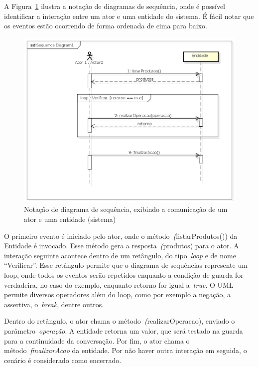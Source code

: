 A Figura~\ref{fig:exemplo-diagrama-sequencia} ilustra a notação de diagramas de sequência, onde é possível identificar a interação entre um ator e uma entidade do sistema. É fácil notar que os eventos estão ocorrendo de forma ordenada de cima para baixo.
\begin{figure}
	\centering
	\includegraphics[scale=0.75]{images/exemplo-diagrama-sequencia.png}
	\caption{Notação de diagrama de sequência, exibindo a comunicação de um ator e uma entidade (sistema)}
	\label{fig:exemplo-diagrama-sequencia}
\end{figure}

O primeiro evento é iniciado pelo ator, onde o método~\emph(listarProdutos()) da Entidade é invocado. Esse método gera a resposta~\emph(produtos) para o ator. A interação seguinte acontece dentro de um retângulo, do tipo~\emph{loop} e de nome ``Verificar''. Esse retângulo permite que o diagrama de sequências represente um loop, onde todos os eventos serão repetidos enquanto a condição de guarda for verdadeira, no caso do exemplo, enquanto retorno for igual a~\emph{true}. O UML permite diversos operadores além do loop, como por exemplo a negação, a assertiva, o~\emph{break}, dentre outros.

Dentro do retângulo, o ator chama o método~\emph(realizarOperacao), enviado o parâmetro~\emph{operação}. A entidade retorna um valor, que será testado na guarda para a continuidade da conversação. Por fim, o ator chama o método~\emph{finalizarAcao} da entidade. Por não haver outra interação em seguida, o cenário é considerado como encerrado. 

